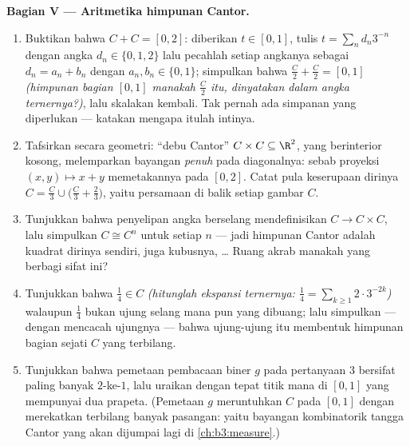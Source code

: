 \begin{problem}
\medskip
\noindent\textbf{Bagian V --- Aritmetika himpunan Cantor.}
\begin{enumerate}[resume]
  \item Buktikan bahwa $C + C = [0, 2]$: diberikan $t \in [0, 1]$,
        tulis $t = \sum_n d_n3^{-n}$ dengan angka $d_n \in \{0,
        1, 2\}$ lalu pecahlah setiap angkanya sebagai $d_n = a_n + b_n$ dengan
        $a_n, b_n \in \{0, 1\}$; simpulkan bahwa $\frac C2 +
        \frac C2 = [0, 1]$ \emph{(himpunan bagian $[0,1]$ manakah
        $\frac C2$ itu, dinyatakan dalam angka ternernya?)}, lalu skalakan kembali.
        Tak pernah ada simpanan yang diperlukan --- katakan mengapa itulah intinya.
  \item Tafsirkan secara geometri: ``debu Cantor'' $C \times
        C \subseteq \R^2$, yang berinterior kosong, melemparkan
        bayangan \emph{penuh} pada diagonalnya: sebab proyeksi $(x,
        y) \mapsto x + y$ memetakannya pada $[0, 2]$. Catat pula
        keserupaan dirinya $C = \frac C3 \cup \bigl(\frac C3 +
        \frac23\bigr)$, yaitu persamaan di balik setiap gambar
        $C$.
  \item Tunjukkan bahwa penyelipan angka berselang mendefinisikan  $C
        \to C \times C$, lalu simpulkan $C \cong C^n$ untuk setiap $n$
        --- jadi himpunan Cantor adalah kuadrat dirinya sendiri, juga kubusnya, \dots{}
        Ruang akrab manakah yang berbagi sifat ini?
  \item Tunjukkan bahwa $\frac14 \in C$ \emph{(hitunglah ekspansi
        ternernya: $\frac14 = \sum_{k\geq1} 2\cdot3^{-2k}$)}
        walaupun $\frac14$ bukan ujung selang mana pun yang
        dibuang; lalu simpulkan --- dengan mencacah ujungnya --- bahwa
        ujung-ujung itu membentuk himpunan bagian sejati $C$ yang terbilang.
  \item Tunjukkan bahwa pemetaan pembacaan biner $g$ pada pertanyaan 3 bersifat
        paling banyak $2$-ke-$1$, lalu uraikan dengan tepat titik mana
        di $[0,1]$ yang mempunyai dua prapeta. (Pemetaan $g$ meruntuhkan $C$ pada
        $[0,1]$ dengan merekatkan terbilang banyak pasangan: yaitu bayangan
        kombinatorik tangga Cantor yang akan dijumpai lagi
        di \cref{ch:b3:measure}.)
\end{enumerate}


\end{problem}

